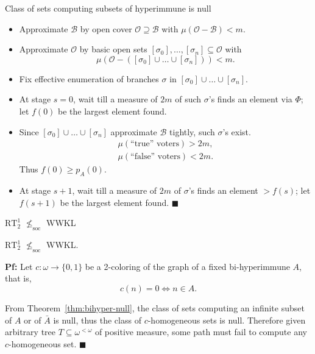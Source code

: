 \begin{frame}{Class of sets computing subsets of hyperimmune is null}
  \begin{itemize}
    \item Approximate $\mathcal{B}$ by open cover
      $\mathcal{O}\supseteq\mathcal{B}$ with
      $\mu(\mathcal{O}-\mathcal{B})<m$.
    \item Approximate $\mathcal{O}$ by basic open sets
      $[\sigma_0],\ldots,[\sigma_n] \subseteq\mathcal{O}$ with
      \[\mu(\mathcal{O}-([\sigma_0]\cup\ldots\cup[\sigma_n])) <m.\]
    \item Fix effective enumeration of branches $\sigma$ in
      $[\sigma_0]\cup\ldots\cup[\sigma_n]$.
    \item At stage $s=0$, wait till a measure of $2m$ of such $\sigma$'s
      finds an element via $\Phi$; let $f(0)$ be the largest element found.
    \item Since $[\sigma_0]\cup\ldots\cup[\sigma_n]$ approximate
      $\mathcal{B}$ tightly, such $\sigma$'s exist.
      \begin{align*}
        \mu(\text{``true'' voters})>2m,\\
        \mu(\text{``false'' voters})<2m.
      \end{align*}
      Thus $f(0)\geq p_A(0)$.
    \item At stage $s+1$, wait till a measure of $2m$ of $\sigma$'s
      finds an element $>f(s)$; let $f(s+1)$ be the largest
      element found. $\blacksquare$
  \end{itemize}
\end{frame}

\begin{frame}{$\text{RT}_2^1$ $\nleq_{\text{soc}}$ WWKL}
  \begin{thm}
    $\text{RT}_2^1$ $\nleq_{\text{soc}}$ WWKL.
  \end{thm}

  \vspace{1em}
  \textbf{Pf:} Let $c:\omega\rightarrow\{0,1\}$ be a 2-coloring of the
  graph of a fixed bi-hyperimmune $A$, that is,
  \[c(n)=0 \Leftrightarrow n\in A.\]
  
  From Theorem~\ref{thm:bihyper-null}, the class of sets computing an
  infinite subset of $A$ or of $\bar{A}$ is null, thus the class of
  $c$-homogeneous sets is null. Therefore given arbitrary tree
  $T\subseteq\omega^{<\omega}$ of positive measure, some path must fail to
  compute any $c$-homogeneous set. $\blacksquare$
\end{frame}

